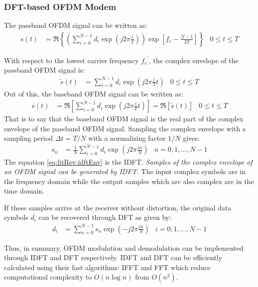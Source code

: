 \subsubsection{DFT-based OFDM Modem}
The passband OFDM signal can be written as:
\begin{align}
	s(t) &= \Re \left\{ \left( \sum_{i=0}^{N-1} d_i \exp (j2\pi \frac{i}{T}) \right) \exp \left[f_c - \frac{N-1}{2T} \right] \right\} & 0 \leq t \leq T
\end{align}
\begin{mathDef}
\end{mathDef}
With respect to the lowest carrier frequency \({f_c}^\prime\), the complex envelope of the passband OFDM signal is:
\begin{align}
	\tilde{s}(t) &= \sum_{i=0}^{N-1} d_i \exp (j2\pi\frac{i}{T}t) & 0 \leq t \leq T
\end{align}
Out of this, the baseband OFDM signal can be written as:
\begin{align}
	s(t) &= \Re \left[ \sum_{i=0}^{N-1} d_i \exp (j2\pi\frac{i}{T}t) \right] = \Re [\tilde{s}(t)] & 0 \leq t \leq T
\end{align}
That is to say that the baseband OFDM signal is the real part of the complex envelope of the passband OFDM signal. Sampling the complex envelope with a sampling period \(\Delta t = T/N\) with a normalizing factor \(1/N\) gives:
\begin{align}
	s_n &= \frac{1}{N} \sum_{i=0}^{N-1} d_i \exp \left( j2\pi \frac{in}{N} \right) & n = 0,1,\ldots,N-1
	\label{eq:litRev:idftEnv}
\end{align}
The equation \eqref{eq:litRev:idftEnv} is the \gls{IDFT}. \emph{Samples of the complex envelope of an OFDM signal can be generated by \gls{IDFT}\cite{fuqin}.} The input complex symbols are in the frequency domain while the output samples which are also complex are in the time domain.

If these samples arrive at the receiver without distortion, the original data symbols \(d_i\) can be recovered through \gls{DFT} as given by:
\begin{align}
	d_i &= \sum_{n=0}^{N-1} s_n \exp \left(-j2\pi\frac{in}{N}\right) & i = 0,1,\ldots,N-1
\end{align}

Thus, in summary, OFDM modulation and demodulation can be implemented through \gls{IDFT} and \gls{DFT} respectively. \gls{IDFT} and \gls{DFT} can be efficiently calculated using their fast algorithms: \gls{IFFT} and \gls{FFT} which reduce computational complexity to \(O(n\log n)\) from \(O(n^2)\).

